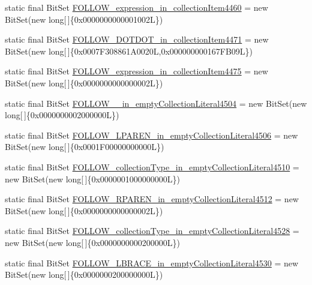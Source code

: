 \begin{DoxyCompactItemize}
static final Bit\-Set \hyperlink{classorg_1_1tzi_1_1use_1_1parser_1_1soil_1_1_soil_parser_a8a5b3646b73eec92360a0afa63cf184d}{F\-O\-L\-L\-O\-W\-\_\-expression\-\_\-in\-\_\-collection\-Item4460} = new Bit\-Set(new long\mbox{[}$\,$\mbox{]}\{0x0000000000001002\-L\})
\item 
static final Bit\-Set \hyperlink{classorg_1_1tzi_1_1use_1_1parser_1_1soil_1_1_soil_parser_a680e6b103d1cb9630bd77e29fa438f98}{F\-O\-L\-L\-O\-W\-\_\-\-D\-O\-T\-D\-O\-T\-\_\-in\-\_\-collection\-Item4471} = new Bit\-Set(new long\mbox{[}$\,$\mbox{]}\{0x0007\-F308861\-A0020\-L,0x000000000167\-F\-B09\-L\})
\item 
static final Bit\-Set \hyperlink{classorg_1_1tzi_1_1use_1_1parser_1_1soil_1_1_soil_parser_aabd9547501e9275474c4426471d8d87f}{F\-O\-L\-L\-O\-W\-\_\-expression\-\_\-in\-\_\-collection\-Item4475} = new Bit\-Set(new long\mbox{[}$\,$\mbox{]}\{0x0000000000000002\-L\})
\item 
static final Bit\-Set \hyperlink{classorg_1_1tzi_1_1use_1_1parser_1_1soil_1_1_soil_parser_afdb9c3c7ef72e07933cd5de5f45b31db}{F\-O\-L\-L\-O\-W\-\_\-\_\-in\-\_\-empty\-Collection\-Literal4504} = new Bit\-Set(new long\mbox{[}$\,$\mbox{]}\{0x0000000002000000\-L\})
\item 
static final Bit\-Set \hyperlink{classorg_1_1tzi_1_1use_1_1parser_1_1soil_1_1_soil_parser_a77f04e6490a43e03492d42e86b964076}{F\-O\-L\-L\-O\-W\-\_\-\-L\-P\-A\-R\-E\-N\-\_\-in\-\_\-empty\-Collection\-Literal4506} = new Bit\-Set(new long\mbox{[}$\,$\mbox{]}\{0x0001\-F00000000000\-L\})
\item 
static final Bit\-Set \hyperlink{classorg_1_1tzi_1_1use_1_1parser_1_1soil_1_1_soil_parser_a4aa4777d18cc31bac843645b926d9aa9}{F\-O\-L\-L\-O\-W\-\_\-collection\-Type\-\_\-in\-\_\-empty\-Collection\-Literal4510} = new Bit\-Set(new long\mbox{[}$\,$\mbox{]}\{0x0000001000000000\-L\})
\item 
static final Bit\-Set \hyperlink{classorg_1_1tzi_1_1use_1_1parser_1_1soil_1_1_soil_parser_a957bc76807483ecd02cce8146eff68b0}{F\-O\-L\-L\-O\-W\-\_\-\-R\-P\-A\-R\-E\-N\-\_\-in\-\_\-empty\-Collection\-Literal4512} = new Bit\-Set(new long\mbox{[}$\,$\mbox{]}\{0x0000000000000002\-L\})
\item 
static final Bit\-Set \hyperlink{classorg_1_1tzi_1_1use_1_1parser_1_1soil_1_1_soil_parser_ad716cf76fe747d293553f9c8ce9b4106}{F\-O\-L\-L\-O\-W\-\_\-collection\-Type\-\_\-in\-\_\-empty\-Collection\-Literal4528} = new Bit\-Set(new long\mbox{[}$\,$\mbox{]}\{0x0000000000200000\-L\})
\item 
static final Bit\-Set \hyperlink{classorg_1_1tzi_1_1use_1_1parser_1_1soil_1_1_soil_parser_a9dc865299aca65e88b000ab441e4bb49}{F\-O\-L\-L\-O\-W\-\_\-\-L\-B\-R\-A\-C\-E\-\_\-in\-\_\-empty\-Collection\-Literal4530} = new Bit\-Set(new long\mbox{[}$\,$\mbox{]}\{0x0000000200000000\-L\})

\end{DoxyCompactItemize}
